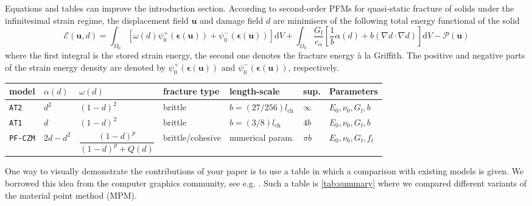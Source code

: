 \documentclass[authoryear,3p,times,preprint,review,fleqn]{elsarticle}
\newcommand{\bfepsilon}{\boldsymbol{\epsilon}}
\newcommand{\bfu}{\boldsymbol{u}}
\newcommand{\td}{\text{d}}
\numberwithin{equation}{section}
\theoremstyle{remark}
\begin{document}
\begin{MyBox}[label={algo-static-FEM}]
{Equations and tables can improve the introduction section.}
According to second-order PFMs for quasi-static fracture of solids under the infinitesimal strain regime, the displacement field $\bfu$ and damage field $d$ are minimisers of the following total energy functional of the solid 
\begin{equation*}
  \mathscr{E} (\bfu, d) 
    = \int_{\varOmega_{0}} \left[\omega(d)\psi_{0}^+(\bfepsilon (\bfu)) + \psi_{0}^-(\bfepsilon (\bfu)) \right]\td V
    + \int_{\varOmega_{0}}  \frac{G_\text{f}}{c_\alpha} \left[ \frac{1}{b} \alpha(d)
    + b \left( \nabla d \cdot \nabla d \right) \right] \td V
    - \mathscr{P} (\bfu)
\label{eq:3}
\end{equation*}
where the first integral is the stored strain energy, the second one denotes the fracture energy \`a la Griffith. The positive and negative parts of the strain energy density are denoted by $\psi_{0}^+(\bfepsilon (\bfu))$ and $\psi_{0}^-(\bfepsilon (\bfu))$, respectively.\\

 \begin{tabularx}{\textwidth}{lllllll}
   \toprule
 model & $\alpha(d)$ &  $\omega(d)$    & fracture type & length-scale & sup.  & Parameters\\
   \midrule     
  \texttt{AT2} & $d^2$  & $(1 - d)^{2}$  & brittle  & $b=(27/256) l_{\text{ch}}$ & $\infty$ & $E_0,\nu_0,G_\text{f},b$ \\
  \texttt{AT1} & $d$    & $(1 - d)^{2}$ &  brittle  & $b=(3/8) l_{\text{ch}}$ & $4b$  & $E_0,\nu_0,G_\text{f},b$\\
  \texttt{PF-CZM} & $2d-d^2$ & $\dfrac{(1 - d)^p}{(1 - d)^p + Q(d)}$ &  brittle/cohesive  & numerical param. & $\pi b$  & $E_0,\nu_0,G_\text{f},f_t$\\
   \bottomrule
 \end{tabularx}%
\end{MyBox}

One way to visually demonstrate the contributions of your paper is to use a table in which a comparison with existing models is given. We borrowed this idea from the computer graphics community, see e.g. \cite{Stomakhin:TG2013a}. Such a table is \cref{tab:summary} where we compared different variants of the material point method (MPM).
\end{document}

